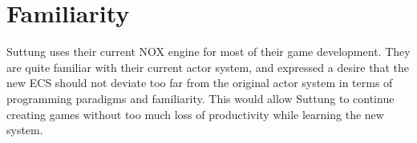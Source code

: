 \section{Familiarity}
Suttung uses their current NOX engine for most of their game development.
They are quite familiar with their current actor system, and expressed a desire that the new
ECS should not deviate too far from the original actor system in terms of programming paradigms
and familiarity.
This would allow Suttung to continue creating games without too much loss of productivity while
learning the new system.
